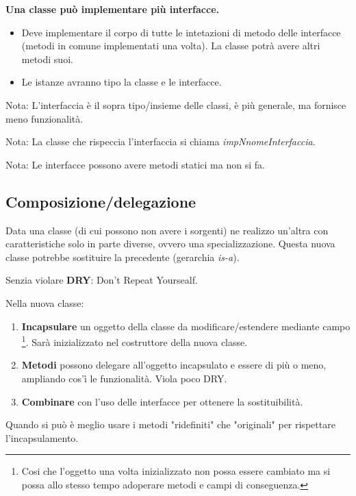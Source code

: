 
\textbf{Una classe può implementare più interfacce.}

\begin{itemize}
	\item Deve implementare il corpo di tutte le intetazioni di metodo delle interfacce (metodi in comune implementati una volta). La classe potrà avere altri metodi suoi.
	\item Le istanze avranno tipo la classe e le interfacce.
\end{itemize}

Nota: L'interfaccia è il sopra tipo/insieme delle classi, è più generale, ma fornisce meno funzionalità.

Nota: La classe che rispeccia l'interfaccia si chiama \textit{impNnomeInterfaccia}.

Nota: Le interfacce possono avere metodi statici ma non si fa.



\subsection{Composizione/delegazione}
Data una classe (di cui possono non avere i sorgenti) ne realizzo un'altra con caratteristiche solo in parte diverse, ovvero una specializzazione. Questa nuova classe potrebbe sostituire la precedente (gerarchia \textit{is-a}).

Senzia violare \textbf{DRY}: Don't Repeat Yoursealf.

Nella nuova classe:
\begin{enumerate}
	\item \textbf{Incapsulare} un oggetto della classe da modificare/estendere mediante campo \footnote{Cosi che l'oggetto una volta inizializzato non possa essere cambiato ma si possa allo stesso tempo adoperare metodi e campi di conseguenza.}. Sarà inizializzato nel costruttore della nuova classe.

	\item \textbf{Metodi} possono delegare all'oggetto incapsulato e essere di più o meno, ampliando cos'ì le funzionalità. Viola poco DRY.

	\item \textbf{Combinare} con l'uso delle interfacce per ottenere la sostituibilità.
\end{enumerate}
Quando si può è meglio usare i metodi "ridefiniti" che "originali" per rispettare l'incapsulamento.




